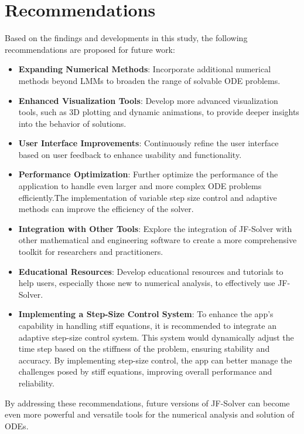 \documentclass[a4paper, twoside]{report} %
\begin{document}
	\section{Recommendations}

	Based on the findings and developments in this study, the following recommendations are proposed for future work:

	\begin{itemize}
		\item \textbf{Expanding Numerical Methods}: Incorporate additional numerical methods beyond LMMs to broaden the range of solvable ODE problems.
		\item \textbf{Enhanced Visualization Tools}: Develop more advanced visualization tools, such as 3D plotting and dynamic animations, to provide deeper insights into the behavior of solutions.
		\item \textbf{User Interface Improvements}: Continuously refine the user interface based on user feedback to enhance usability and functionality.

		\item \textbf{Performance Optimization}: Further optimize the performance of the application to handle even larger and more complex ODE problems efficiently.The implementation of variable step size control and adaptive methods can improve the efficiency of the solver.
		\item \textbf{Integration with Other Tools}: Explore the integration of JF-Solver with other mathematical and engineering software to create a more comprehensive toolkit for researchers and practitioners.
		\item \textbf{Educational Resources}: Develop educational resources and tutorials to help users, especially those new to numerical analysis, to effectively use JF-Solver.
		\item \textbf{Implementing a Step-Size Control System}: To enhance the app's capability in handling stiff equations, it is recommended to integrate an adaptive step-size control system. This system would dynamically adjust the time step based on the stiffness of the problem, ensuring stability and accuracy. By implementing step-size control, the app can better manage the challenges posed by stiff equations, improving overall performance and reliability.
	\end{itemize}

	By addressing these recommendations, future versions of JF-Solver can become even more powerful and versatile tools for the numerical analysis and solution of ODEs.



	
	
\end{document}
